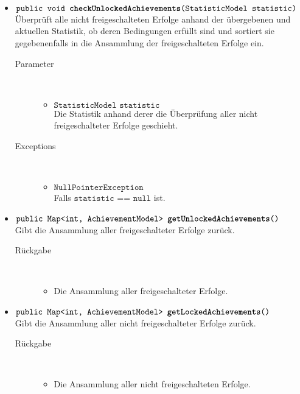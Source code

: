 \begin{description}
\begin{itemize}
		\item $\texttt{public void \textbf{checkUnlockedAchievements}(StatisticModel statistic)}$ \\ Überprüft alle nicht freigeschalteten Erfolge anhand der übergebenen und aktuellen Statistik, ob deren Bedingungen erfüllt sind und sortiert sie gegebenenfalls in die Ansammlung  der freigeschalteten Erfolge ein.
		\begin{description}
		\item[Parameter] \hfill \\
			\vspace{-.8cm}
			\begin{itemize}
				\item $\texttt{StatisticModel statistic}$ \\ Die Statistik anhand derer die Überprüfung aller nicht freigeschalteter Erfolge geschieht. 
			\end{itemize}
			\item[Exceptions] \hfill \\
			\vspace{-.8cm}
			\begin{itemize}
				\item $\texttt{NullPointerException}$ \\ Falls $\texttt{statistic == null}$ ist.
			\end{itemize}
		\end{description}	
		
		\item $\texttt{public Map<int, AchievementModel> \textbf{getUnlockedAchievements}()}$ \\ Gibt die Ansammlung aller freigeschalteter Erfolge zurück.
		\begin{description}
			\item[Rückgabe] \hfill \\
			\vspace{-.8cm}
			\begin{itemize}
				\item Die Ansammlung aller freigeschalteter Erfolge.
			\end{itemize}
		\end{description}
		
		\item $\texttt{public Map<int, AchievementModel> \textbf{getLockedAchievements}()}$ \\ Gibt die Ansammlung aller nicht freigeschalteter Erfolge zurück.
		\begin{description}
			\item[Rückgabe] \hfill \\
			\vspace{-.8cm}
			\begin{itemize}
				\item Die Ansammlung aller nicht freigeschalteten Erfolge.
			\end{itemize}
		\end{description}
		

\end{itemize}
\end{description}
